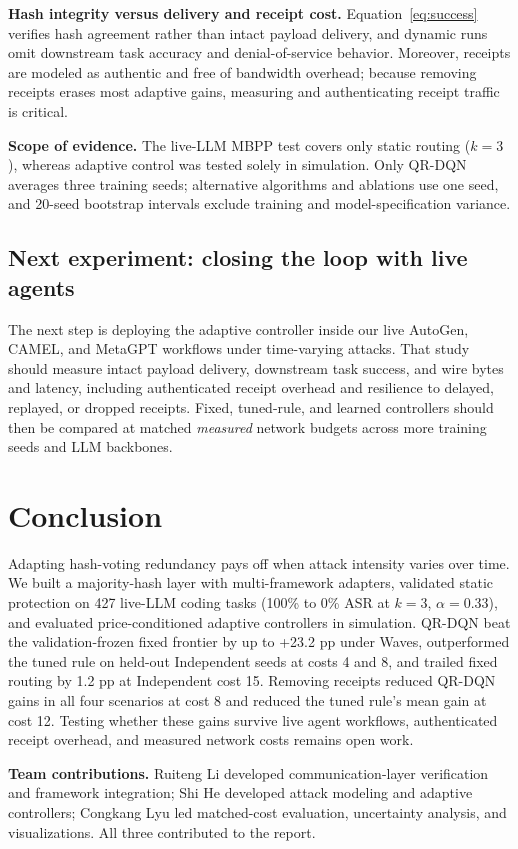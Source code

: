 \documentclass[10pt,twocolumn]{article}
\begin{document}
\textbf{Hash integrity versus delivery and receipt cost.} Equation~\eqref{eq:success} verifies hash agreement rather than intact payload delivery, and dynamic runs omit downstream task accuracy and denial-of-service behavior. Moreover, receipts are modeled as authentic and free of bandwidth overhead; because removing receipts erases most adaptive gains, measuring and authenticating receipt traffic is critical.

\textbf{Scope of evidence.} The live-LLM MBPP test covers only static routing ($k=3$), whereas adaptive control was tested solely in simulation. Only QR-DQN averages three training seeds; alternative algorithms and ablations use one seed, and 20-seed bootstrap intervals exclude training and model-specification variance.

\subsection{Next experiment: closing the loop with live agents}
The next step is deploying the adaptive controller inside our live AutoGen, CAMEL, and MetaGPT workflows under time-varying attacks. That study should measure intact payload delivery, downstream task success, and wire bytes and latency, including authenticated receipt overhead and resilience to delayed, replayed, or dropped receipts. Fixed, tuned-rule, and learned controllers should then be compared at matched \emph{measured} network budgets across more training seeds and LLM backbones.

\section{Conclusion}
Adapting hash-voting redundancy pays off when attack intensity varies over time. We built a majority-hash layer with multi-framework adapters, validated static protection on 427 live-LLM coding tasks (100\% to 0\% ASR at $k=3$, $\alpha=0.33$), and evaluated price-conditioned adaptive controllers in simulation. QR-DQN beat the validation-frozen fixed frontier by up to +23.2 pp under Waves, outperformed the tuned rule on held-out Independent seeds at costs 4 and 8, and trailed fixed routing by 1.2 pp at Independent cost 15. Removing receipts reduced QR-DQN gains in all four scenarios at cost 8 and reduced the tuned rule's mean gain at cost 12. Testing whether these gains survive live agent workflows, authenticated receipt overhead, and measured network costs remains open work.

\noindent\textbf{Team contributions.} Ruiteng Li developed communication-layer verification and framework integration; Shi He developed attack modeling and adaptive controllers; Congkang Lyu led matched-cost evaluation, uncertainty analysis, and visualizations. All three contributed to the report.

\clearpage
\balance


\end{document}
